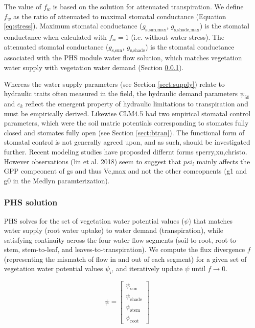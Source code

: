 \documentclass[draft,linenumbers]{agujournal}
\begin{document}
    The value of $f_w$ is based on the solution for attenuated transpiration.
    We define $f_w$ as the ratio of attenuated to maximal stomatal conductance (Equation \ref{eq:stress}).
    Maximum stomatal conductance ($g_{\text{s,sun,max}}$, $g_{\text{s,shade,max}}$) is the stomatal conductance when calculated with $f_w=1$
    (i.e. without water stress). 
    The attenuated stomatal conductance ($g_{\text{s,sun}}$, $g_{\text{s,shade}}$) is the stomatal conductance associated with the PHS module
    water flow solution, which matches vegetation water supply with vegetation water demand 
    (Section \ref{sect:solution}).
    
     Whereas the water supply parameters (see Section \ref{sect:supply}) relate to hydraulic traits often measured in the field, 
     the hydraulic demand parameters $\psi_{50}$ and $c_k$ reflect the emergent property of hydraulic limitations to transpiration and must be empirically derived. 
     Likewise CLM4.5 had two empirical stomatal control parameters, which were the soil matric potentials 
     corresponding to stomates fully closed and stomates fully open (see Section \ref{sect:btran}).
     The functional form of stomatal control is not generally agreed upon, and as such, should be investigated further. 
     Recent modeling studies have proposded differnt forms sperry,xu,christo. 
     However observations (lin et al. 2018) seem to suggest that $psi_l$ mainly affects the GPP compeonent of gs and thus Vc,max and not the other comeopnents (g1 and g0 in the Medlyn paramterization).

    \subsubsection{PHS solution}
    \label{sect:solution}
    
    PHS solves for the set of vegetation water potential values ($\psi$) that matches water supply
    (root water uptake) to water demand (transpiration), while satisfying continuity across the four water flow
    segments (soil-to-root, root-to-stem, stem-to-leaf, and leaves-to-transpiration). 
    We compute the flux divergence $f$ (representing the mismatch of flow in and out of each segment)
    for a given set of vegetation water potential values $\psi_i$, and iteratively update $\psi$ until $f\to0$.
    
    \begin{linenomath*}
    \begin{equation} 
    \psi = \left[
    \begin{array}{c}
    \psi_{\text{sun}} \\ 
    \psi_{\text{shade}} \\ 
    \psi_{\text{stem}} \\ 
    \psi_{\text{root}}            
    \end{array} \right]
    \end{equation}
    \end{linenomath*}
    
\end{document}
